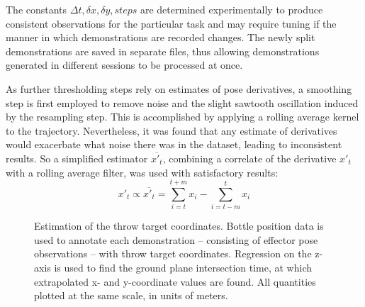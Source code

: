 \documentclass{article}
\begin{document}
The constants $\Delta t, \delta x, \delta y, steps$ are determined experimentally to produce consistent observations for the particular task and may require tuning if the manner in which demonstrations are recorded changes. The newly split demonstrations are saved in separate files, thus allowing demonstrations generated in different sessions to be processed at once.

As further thresholding steps rely on estimates of pose derivatives, a smoothing step is first employed to remove noise and the slight sawtooth oscillation induced by the resampling step. This is accomplished by applying a rolling average kernel to the trajectory. Nevertheless, it was found that any estimate of derivatives would exacerbate what noise there was in the dataset, leading to inconsistent results. So a simplified estimator $\overline{x'_t}$, combining a correlate of the derivative $x'_t$ with a rolling average filter, was used with satisfactory results:
\begin{equation}
    x'_t \propto \overline{x'_t} = \sum_{i=t}^{t+m}  x_i - \sum_{i=t-m}^{t}  x_i
\end{equation}


\begin{figure}
	\centering
	\caption{Estimation of the throw target coordinates. Bottle position data is used to annotate each demonstration -- consisting of effector pose observations -- with throw target coordinates. Regression on the z-axis is used to find the ground plane intersection time, at which extrapolated x- and y-coordinate values are found. All quantities plotted at the same scale, in units of meters.}
	\label{fig:fig3}
\end{figure}
\end{document}
